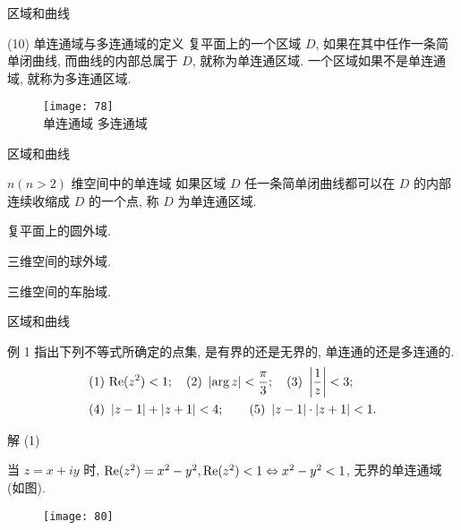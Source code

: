 \documentclass{beamer}
\begin{document}
\begin{frame}{区域和曲线}
\begin{alertblock}{(10) 单连通域与多连通域的定义}
复平面上的一个区域 $ D $,   如果在其中任作一条简单闭曲线,  而曲线的内部总属于 $ D $,   就称为单连通区域. 一个区域如果不是单连通域, 就称为多连通区域. 
\begin{figure}\centering
\texttt{[image: 78]}\\
\qquad\quad 单连通域 \qquad\qquad\qquad\qquad\qquad\quad 多连通域
\end{figure}
\end{alertblock}
\end{frame}

\begin{frame}{区域和曲线}
\begin{alertblock}{$ n( n >2) $ 维空间中的单连域}
如果区域 $ D $ 任一条简单闭曲线都可以在 $ D $ 的内部连续收缩成 $ D $ 的一个点, 称 $ D $ 为单连通区域. 

\begin{example}
	复平面上的圆外域. 
\end{example}

\begin{example}
	三维空间的球外域. 	
\end{example}

\begin{example}
	三维空间的车胎域. 	
\end{example}
\end{alertblock}

\end{frame}

\begin{frame}{区域和曲线}
\begin{block}{例 1}
指出下列不等式所确定的点集, 是有界的还是无界的, 单连通的还是多连通的.
\begin{align*}
& (1)~{\rm Re} ({z^2}) < 1; \quad (2)~\left| {\arg z} \right| < \frac{\pi }{3}; \quad (3)~\left| {\frac{1}{z}} \right| < 3; \\
&(4)~\left| {z - 1} \right| + \left| {z + 1} \right| < 4; \quad \quad (5)~\left| {z - 1} \right| \cdot \left| {z + 1} \right| < 1.
\end{align*}
\bigskip

解 (1) \begin{minipage}[t]{0.5\linewidth}
当 $ z = x + iy $ 时, 
 $ {\rm Re} ({z^2}) = {x^2} - {y^2}, {\rm Re} ({z^2}) < 1 \Leftrightarrow {x^2} - {y^2} < 1 $,  无界的单连通域(如图).
\end{minipage}\qquad
\begin{minipage}[t]{0.3\linewidth}
\begin{figure}
\texttt{[image: 80]}
\end{figure}
\end{minipage}

\end{block}
\end{frame}
\end{document}
